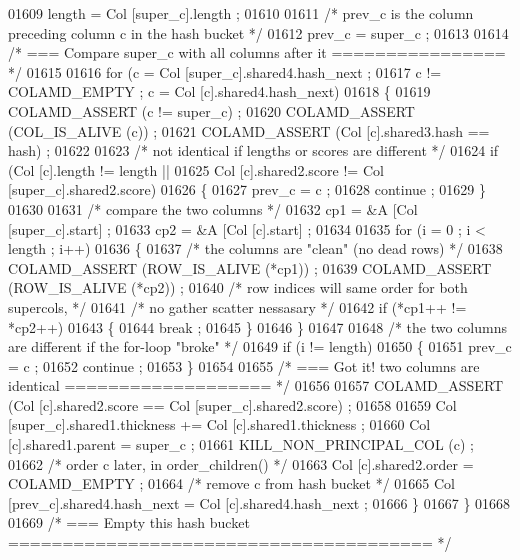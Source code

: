 \begin{DoxyCode}
{{{{{{{{{{{{{{{{{{{{{{{{{{{{01609       length = Col [super\_c].length ;
01610 
01611       \textcolor{comment}{/* prev\_c is the column preceding column c in the hash bucket */}
01612       prev\_c = super\_c ;
01613 
01614       \textcolor{comment}{/* === Compare super\_c with all columns after it ================ */}
01615 
01616       \textcolor{keywordflow}{for} (c = Col [super\_c].shared4.hash\_next ;
01617        c != COLAMD\_EMPTY ; c = Col [c].shared4.hash\_next)
01618       \{
01619     COLAMD\_ASSERT (c != super\_c) ;
01620     COLAMD\_ASSERT (COL\_IS\_ALIVE (c)) ;
01621     COLAMD\_ASSERT (Col [c].shared3.hash == hash) ;
01622 
01623     \textcolor{comment}{/* not identical if lengths or scores are different */}
01624     \textcolor{keywordflow}{if} (Col [c].length != length ||
01625         Col [c].shared2.score != Col [super\_c].shared2.score)
01626     \{
01627       prev\_c = c ;
01628       continue ;
01629     \}
01630 
01631     \textcolor{comment}{/* compare the two columns */}
01632     cp1 = &A [Col [super\_c].start] ;
01633     cp2 = &A [Col [c].start] ;
01634 
01635     \textcolor{keywordflow}{for} (i = 0 ; i < length ; i++)
01636     \{
01637       \textcolor{comment}{/* the columns are "clean" (no dead rows) */}
01638       COLAMD\_ASSERT (ROW\_IS\_ALIVE (*cp1))  ;
01639       COLAMD\_ASSERT (ROW\_IS\_ALIVE (*cp2))  ;
01640       \textcolor{comment}{/* row indices will same order for both supercols, */}
01641       \textcolor{comment}{/* no gather scatter nessasary */}
01642       \textcolor{keywordflow}{if} (*cp1++ != *cp2++)
01643       \{
01644         break ;
01645       \}
01646     \}
01647 
01648     \textcolor{comment}{/* the two columns are different if the for-loop "broke" */}
01649     \textcolor{keywordflow}{if} (i != length)
01650     \{
01651       prev\_c = c ;
01652       continue ;
01653     \}
01654 
01655     \textcolor{comment}{/* === Got it!  two columns are identical =================== */}
01656 
01657     COLAMD\_ASSERT (Col [c].shared2.score == Col [super\_c].shared2.score) ;
01658 
01659     Col [super\_c].shared1.thickness += Col [c].shared1.thickness ;
01660     Col [c].shared1.parent = super\_c ;
01661     KILL\_NON\_PRINCIPAL\_COL (c) ;
01662     \textcolor{comment}{/* order c later, in order\_children() */}
01663     Col [c].shared2.order = COLAMD\_EMPTY ;
01664     \textcolor{comment}{/* remove c from hash bucket */}
01665     Col [prev\_c].shared4.hash\_next = Col [c].shared4.hash\_next ;
01666       \}
01667     \}
01668 
01669     \textcolor{comment}{/* === Empty this hash bucket ======================================= */}
}}}}}}}}}}}}}}}}}}}}}}}}}}}}
\end{DoxyCode}
